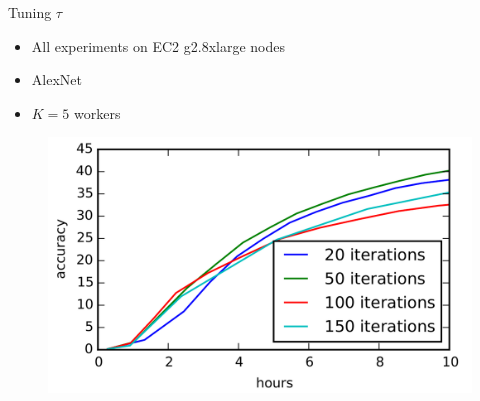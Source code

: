 \documentclass[pdf]{beamer}
\begin{document}
\begin{frame}[t]{Tuning $\tau$}
    \begin{itemize}
        \item All experiments on EC2 g2.8xlarge nodes
        \item AlexNet \cite{krizhevsky2012imagenet}
        \item $K=5$ workers
    \end{itemize}
    \begin{figure}[htpb]
        \centering
        \includegraphics[width=0.6\linewidth]{Figures/tau-acc.png}
    \end{figure}
\end{frame}
\end{document}
